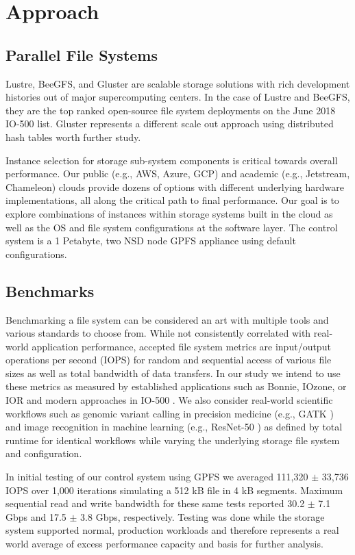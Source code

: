 \documentclass[conference]{IEEEtran}
\begin{document}
\section{Approach}

\subsection{Parallel File Systems}
Lustre, BeeGFS, and Gluster are scalable storage solutions with rich development histories out of major supercomputing centers. In the case of Lustre and BeeGFS, they are the top ranked open-source file system deployments on the June 2018 IO-500 list. Gluster represents a different scale out approach using distributed hash tables worth further study. 

Instance selection for storage sub-system components is critical towards overall performance. Our public (e.g., AWS, Azure, GCP) and academic (e.g., Jetstream, Chameleon) clouds provide dozens of options with different underlying hardware implementations, all along the critical path to final performance. Our goal is to explore combinations of instances within storage systems built in the cloud as well as the OS and file system configurations at the software layer. The control system is a 1 Petabyte, two NSD node GPFS appliance using default configurations.

\subsection{Benchmarks}
Benchmarking a file system can be considered an art with multiple tools and various standards to choose from. While not consistently correlated with real-world application performance, accepted file system metrics are input/output operations per second (IOPS) for random and sequential access of various file sizes as well as total bandwidth of data transfers. In our study we intend to use these metrics as measured by established applications such as Bonnie, IOzone, or IOR and modern approaches in IO-500 \cite{kunkel}. We also consider real-world scientific workflows such as genomic variant calling in precision medicine (e.g., GATK \cite{mckenna}) and image recognition in machine learning (e.g., ResNet-50 \cite{he}) as defined by total runtime for identical workflows while varying the underlying storage file system and configuration.

In initial testing of our control system using GPFS we averaged 111,320 $\pm$ 33,736 IOPS over 1,000 iterations simulating a 512 kB file in 4 kB segments. Maximum sequential read and write bandwidth for these same tests reported 30.2 $\pm$ 7.1 Gbps and 17.5 $\pm$ 3.8 Gbps, respectively. Testing was done while the storage system supported normal, production workloads and therefore represents a real world average of excess performance capacity and basis for further analysis. 
\end{document}
